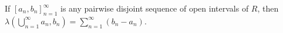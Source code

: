 If $[a_n, b_n]_{n=1}^{\infty}$ is any pairwise disjoint sequence of open intervals of $R$, then $\lambda \left( \bigcup_{n=1}^{\infty} a_n, b_n \right) = \sum_{n=1}^{\infty} (b_n - a_n)$.